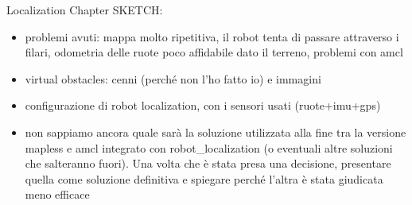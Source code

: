 Localization Chapter SKETCH:
\begin{itemize}
	\item problemi avuti: mappa molto ripetitiva, il robot tenta di passare attraverso i filari, odometria delle ruote poco affidabile dato il terreno, problemi con amcl
	\item virtual obstacles: cenni (perché non l'ho fatto io) e immagini
	\item configurazione di robot localization, con i sensori usati (ruote+imu+gps)
	\item non sappiamo ancora quale sarà la soluzione utilizzata alla fine tra la versione mapless e amcl integrato con robot\_localization (o eventuali altre soluzioni che salteranno fuori). Una volta che è stata presa una decisione, presentare quella come soluzione definitiva e spiegare perché l'altra è stata giudicata meno efficace
\end{itemize}

